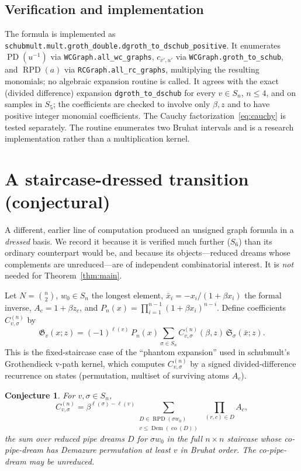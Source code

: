 \documentclass[11pt]{article}
\newtheorem{conjecture}[theorem]{Conjecture}
\theoremstyle{definition}
\theoremstyle{remark}
\newcommand{\Sch}{\mathfrak{S}}
\newcommand{\Groth}{\mathfrak{G}}
\newcommand{\PD}{\operatorname{PD}}
\newcommand{\RPD}{\operatorname{RPD}}
\newcommand{\Dem}{\operatorname{Dem}}
\newcommand{\co}{\operatorname{co}}
\begin{document}
\subsection{Verification and implementation}

The formula is implemented as
\texttt{schubmult.mult.groth\_double.dgroth\_to\_dschub\_positive}.
It enumerates $\PD(u^{-1})$ via \texttt{WCGraph.all\_wc\_graphs},
$c_{v',u'}$ via \texttt{WCGraph.groth\_to\_schub}, and $\RPD(a)$ via
\texttt{RCGraph.all\_rc\_graphs}, multiplying the resulting monomials; no
algebraic expansion routine is called.  It agrees with the exact (divided
difference) expansion \texttt{dgroth\_to\_dschub} for every $v\in S_n$,
$n\le4$, and on samples in $S_5$; the coefficients are checked to involve
only $\beta,z$ and to have positive integer monomial coefficients.  The
Cauchy factorization~\eqref{eq:cauchy} is tested separately.  The routine
enumerates two Bruhat intervals and is a research implementation rather
than a multiplication kernel.

\section{A staircase-dressed transition (conjectural)}

A different, earlier line of computation produced an unsigned graph formula
in a \emph{dressed} basis.  We record it because it is verified much
further ($S_6$) than its ordinary counterpart would be, and because its
objects---reduced dreams whose complements are unreduced---are of
independent combinatorial interest.  It is \emph{not} needed for
Theorem~\ref{thm:main}.

Let $N=\binom n2$, $w_0\in S_n$ the longest element,
$\bar x_i=-x_i/(1+\beta x_i)$ the formal inverse, $A_c=1+\beta z_c$, and
$P_n(x)=\prod_{i=1}^{n-1}(1+\beta x_i)^{n-i}$.  Define coefficients
$C^{(n)}_{v,\sigma}$ by
\begin{equation}\label{eq:dressed}
 \Groth_v(x;z)=(-1)^{\ell(v)}\,P_n(x)\sum_{\sigma\in S_n}
   C^{(n)}_{v,\sigma}(\beta,z)\,\Sch_\sigma(\bar x;z).
\end{equation}
This is the fixed-staircase case of the ``phantom expansion'' used in
\textsf{schubmult}'s Grothendieck v-path kernel, which computes
$C^{(n)}_{v,\sigma}$ by a signed divided-difference recurrence on states
(permutation, multiset of surviving atoms $A_c$).

\begin{conjecture}\label{conj:dressed}
For $v,\sigma\in S_n$,
\[
 C^{(n)}_{v,\sigma}=\beta^{\ell(\sigma)-\ell(v)}
 \sum_{\substack{D\in\RPD(\sigma w_0)\\v\le\Dem(\co(D))}}
 \ \prod_{(r,c)\in D}A_c,
\]
the sum over reduced pipe dreams $D$ for $\sigma w_0$ in the full
$n\times n$ staircase whose co-pipe-dream has Demazure permutation at least
$v$ in Bruhat order.  The co-pipe-dream may be unreduced.
\end{conjecture}
\end{document}
